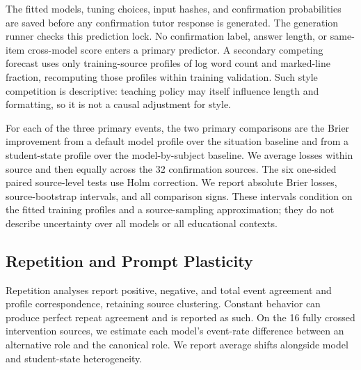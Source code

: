The fitted models, tuning choices, input hashes, and confirmation probabilities
are saved before any confirmation tutor response is generated. The generation
runner checks this prediction lock. No confirmation label, answer length, or
same-item cross-model score enters a primary predictor. A secondary competing
forecast uses only training-source profiles of log word count and marked-line
fraction, recomputing those profiles within training validation. Such style
competition is descriptive: teaching policy may itself influence length and
formatting, so it is not a causal adjustment for style.

For each of the three primary events, the two primary comparisons are the Brier
improvement from a default model profile over the situation baseline and from a
student-state profile over the model-by-subject baseline. We average losses
within source and then equally across the 32 confirmation sources. The six
one-sided paired source-level tests use Holm correction. We report absolute
Brier losses, source-bootstrap intervals, and all comparison signs. These
intervals condition on the fitted training profiles and a source-sampling
approximation; they do not describe uncertainty over all models or all
educational contexts.

\subsection{Repetition and Prompt Plasticity}

Repetition analyses report positive, negative, and total event agreement and
profile correspondence, retaining source clustering. Constant behavior can
produce perfect repeat agreement and is reported as such. On the 16 fully
crossed intervention sources, we estimate each model's event-rate difference
between an alternative role and the canonical role. We report average shifts
alongside model and student-state heterogeneity.

